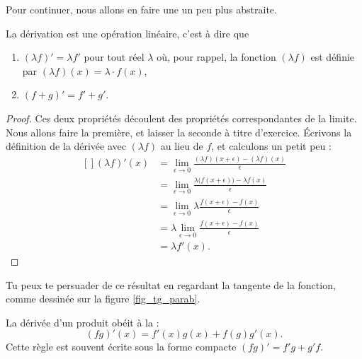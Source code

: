 Pour continuer, nous allons en faire une un peu plus abstraite.
\begin{proposition}		\label{PropDerrLin}
	La dérivation est une opération linéaire, c'est à dire que
	\begin{enumerate}
		\item $(\lambda f)'=\lambda f'$ pour tout réel $\lambda$ où, pour rappel, la fonction $(\lambda f)$ est définie par $(\lambda f)(x)=\lambda\cdot f(x)$,
		\item $(f+g)'=f'+g'$.
	\end{enumerate}
\end{proposition}

\begin{proof}
Ces deux propriétés découlent des propriétés correspondantes de la limite. Nous allons faire la première, et laisser la seconde à titre d'exercice. Écrivons la définition de la dérivée avec $(\lambda f)$ au lieu de $f$, et calculons un petit peu :
\begin{equation}
	\begin{aligned}[]
		(\lambda f)'(x)	&=\lim_{\epsilon\to 0}\frac{ (\lambda f)(x+\epsilon)-(\lambda f)(x) }{ \epsilon }\\
				&=\lim_{\epsilon\to 0}\frac{ \lambda \big( f(x+\epsilon) \big)-\lambda f(x) }{ \epsilon }\\
				&=\lim_{\epsilon\to 0}\lambda \frac{ f(x+\epsilon) -f(x) }{ \epsilon }\\
				&=\lambda \lim_{\epsilon\to 0}\frac{ f(x+\epsilon) -f(x) }{ \epsilon }\\
				&=\lambda f'(x).
	\end{aligned}
\end{equation}
\end{proof}

Tu peux te persuader de ce résultat en regardant la tangente de la fonction, comme dessinée sur la figure \ref{fig_tg_parab}.


\begin{proposition}
	La dérivée d'un produit obéit à la :
	\begin{equation}
		(fg)'(x)=f'(x)g(x)+f(g)g'(x).
	\end{equation}
	Cette règle est souvent écrite sous la forme compacte $(fg)'=f'g+g'f$.
\end{proposition}

